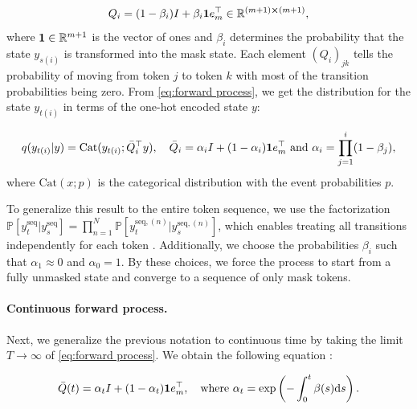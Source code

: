 \begin{equation}
    Q_i = (1 - \beta_i) I + \beta_i\bold{1}e_m^\top\in\mathbb{R}^{(m + 1)\cross(m + 1)},
    \label{eq:forward process}
\end{equation}
where $\bold{1}\in\mathbb{R}^{m + 1}$ is the vector of ones and $\beta_i$ determines the probability that the state $y_{s(i)}$ is transformed into the mask state. Each element $(Q_i)_{jk}$ tells the probability of moving from token $j$ to token $k$ with most of the transition probabilities being zero. From \eqref{eq:forward process}, we get the distribution for the state $y_{t(i)}$ in terms of the one-hot encoded state $y$:

\begin{equation*}
    q(y_{t(i)} | y) = \text{Cat}(y_{t(i)}; \bar{Q}_i^\top y), \quad\bar{Q}_i = \alpha_i I + (1 - \alpha_i)\bold{1}e_m^\top \text{ and } \alpha_i = \prod_{j=1}^{i}(1 - \beta_j),
\end{equation*}
where $\text{Cat}(x; p)$ is the categorical distribution with the event probabilities $p$.

To generalize this result to the entire token sequence, we use the factorization $\mathbb{P}[y_t^\text{seq} | y_s^\text{seq}] = \prod_{n=1}^{N}\mathbb{P}[y_t^{\text{seq},(n)} | y_s^{\text{seq},(n)}]$, which enables treating all transitions independently for each token \cite{shi2025simplifiedgeneralizedmaskeddiffusion}. Additionally, we choose the probabilities $\beta_i$ such that $\alpha_1\approx 0$ and $\alpha_0 = 1$. By these choices, we force the process to start from a fully unmasked state and converge to a sequence of only mask tokens.


\paragraph{Continuous forward process.}

Next, we generalize the previous notation to continuous time by taking the limit $T\rightarrow\infty$ of \eqref{eq:forward process}. We obtain the following equation \cite{austin2021structureddenoisingdiffusionmodels, shi2025simplifiedgeneralizedmaskeddiffusion}:

\begin{equation*}
    \bar{Q}(t) = \alpha_tI + (1 - \alpha_t)\bold{1}e_m^\top, \quad\text{where }\alpha_t = \exp\left( -\int_{0}^{t}\beta(s)\mathrm{d}s \right).
\end{equation*}

